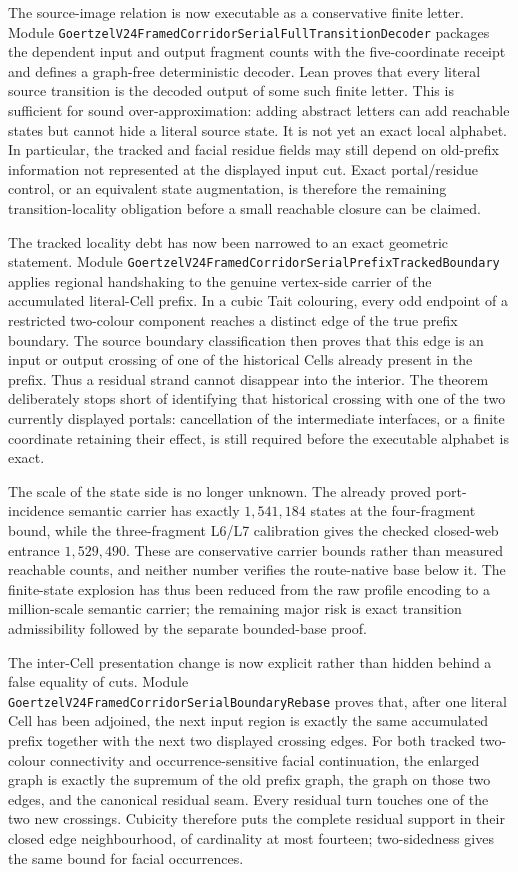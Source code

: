 \documentclass[11pt]{article}
\theoremstyle{definition}
\begin{document}
The source-image relation is now executable as a conservative finite letter.
Module
\texttt{GoertzelV24FramedCorridorSerialFullTransitionDecoder} packages the
dependent input and output fragment counts with the five-coordinate receipt
and defines a graph-free deterministic decoder.  Lean proves that every
literal source transition is the decoded output of some such finite letter.
This is sufficient for sound over-approximation: adding abstract letters can
add reachable states but cannot hide a literal source state.  It is not yet an
exact local alphabet.  In particular, the tracked and facial residue fields
may still depend on old-prefix information not represented at the displayed
input cut.  Exact portal/residue control, or an equivalent state
augmentation, is therefore the remaining transition-locality obligation
before a small reachable closure can be claimed.

The tracked locality debt has now been narrowed to an exact geometric
statement.  Module
\texttt{GoertzelV24FramedCorridorSerialPrefixTrackedBoundary} applies
regional handshaking to the genuine vertex-side carrier of the accumulated
literal-Cell prefix.  In a cubic Tait colouring, every odd endpoint of a
restricted two-colour component reaches a distinct edge of the true prefix
boundary.  The source boundary classification then proves that this edge is
an input or output crossing of one of the historical Cells already present in
the prefix.  Thus a residual strand cannot disappear into the interior.  The
theorem deliberately stops short of identifying that historical crossing
with one of the two currently displayed portals: cancellation of the
intermediate interfaces, or a finite coordinate retaining their effect, is
still required before the executable alphabet is exact.

The scale of the state side is no longer unknown.  The already proved
port-incidence semantic carrier has exactly $1{,}541{,}184$ states at the
four-fragment bound, while the three-fragment L6/L7 calibration gives the
checked closed-web entrance $1{,}529{,}490$.  These are conservative carrier
bounds rather than measured reachable counts, and neither number verifies
the route-native base below it.  The finite-state explosion has thus been
reduced from the raw profile encoding to a million-scale semantic carrier;
the remaining major risk is exact transition admissibility followed by the
separate bounded-base proof.

The inter-Cell presentation change is now explicit rather than hidden behind
a false equality of cuts.  Module
\texttt{GoertzelV24FramedCorridorSerialBoundaryRebase} proves that, after one
literal Cell has been adjoined, the next input region is exactly the same
accumulated prefix together with the next two displayed crossing edges.  For
both tracked two-colour connectivity and occurrence-sensitive facial
continuation, the enlarged graph is exactly the supremum of the old prefix
graph, the graph on those two edges, and the canonical residual seam.  Every
residual turn touches one of the two new crossings.  Cubicity therefore puts
the complete residual support in their closed edge neighbourhood, of
cardinality at most fourteen; two-sidedness gives the same bound for facial
occurrences.
\end{document}
